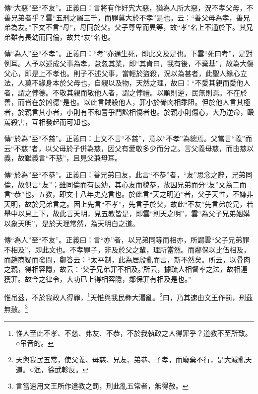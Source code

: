 {\noindent\zhuan{}\fzbyks 傳“大惡”至“不友”。正義曰：言將有作奸宄大惡，猶為人所大惡，況不孝父母，不善兄弟者乎？雲“五刑之屬三千，而罪莫大於不孝”是也。云：“善父母為孝，善兄弟為友。”下文不言“母”，母同於父。父子尊卑而異等，故“孝”名上不通於下。其兄弟雖有長幼而同倫，故共“友”名也。 \par}

{\noindent\zhuan{}\fzbyks 傳“為人”至“不孝”。正義曰：“考”亦通生死，即此文及是也。下雲“死曰考”，是對例耳。人予以述成父事為孝，怠忽其業，即“其肯曰，我有後，不棄基”，故為大傷父心，即是上不孝也。則子不述父事，當輕於盜殺，況以為甚者，此聖人緣心立法，人莫不緣身本於父母也，自親以及物，天然之理，故曰：“不愛其親而愛他人者，謂之悖德。不敬其親而敬他人者，謂之悖禮。以順則逆，民無則焉。不在於善，而皆在於凶德”是也。以此言賊殺他人，罪小於骨肉相乖阻。但於他人言其極者，於親言其小者，小則有不和詈爭鬥訟相傷者也。於親小則傷心，大乃逆命，毆罵殺害，互相發起而可知也。 \par}

{\noindent\zhuan{}\fzbyks 傳“於為”至“不慈”。正義曰：上文不言“不慈”，意以“不孝”為總焉。父當言“義”而云“不慈”者，以父母於子併為慈，因父有愛敬多少而分之。言父義母慈，而由慈以義，故雖義言“不慈”，且見父兼母耳。 \par}

{\noindent\zhuan{}\fzbyks 傳“於為”至“不恭”。正義曰：善兄弟曰友，此言“不恭”者，“友”思念之辭，兄弟同倫，故俱言“友”；雖同倫而有長幼，其心友而貌恭，故因兄弟而分“友”文為二而言“恭”也。五教，即文十八年史克言也。於此言“天之明道”者，父子天性，不嫌非天明，故於兄弟言之。因上先言“不孝”，先言子於父，故此“不友”先言弟於兄，若舉中以見上下，故此言天明，見五教皆是，即雲“則天之明”，雲“為父子兄弟姻媾以象天明”，是於天理常然，為天明白之道。 \par}

{\noindent\zhuan{}\fzbyks 傳“為人”至“不友”。正義曰：言“亦”者，以兄弟同等而相亦，所謂雲“父子兄弟罪不相及”，即此文也。不孝罪子，非及於父之輩，理所當然。而鄰保以比伍相及，而趙商疑而發問，鄭答云：“太平制，此為居殷亂而言，斯不然矣。所云，以骨肉之親，得相容隱，故云：‘父子兄弟罪不相及。’所云，據疏人相督率之法，故相連獲罪。故今之律令，大功已上得相容隱，鄰保罪有相及是也。” \par}

惟吊茲，不於我政人得罪，\footnote{惟人至此不孝、不慈、弗友、不恭，不於我執政之人得罪乎？道教不至所致。○吊音的。}天惟與我民彝大湣亂。\footnote{天與我民五常，使父義、母慈、兄友、弟恭、子孝，而廢棄不行，是大滅亂天道。○泯，徐武軫反。}曰，乃其速由文王作罰，刑茲無赦。\footnote{言當速用文王所作違教之罰，刑此亂五常者，無得赦。}

